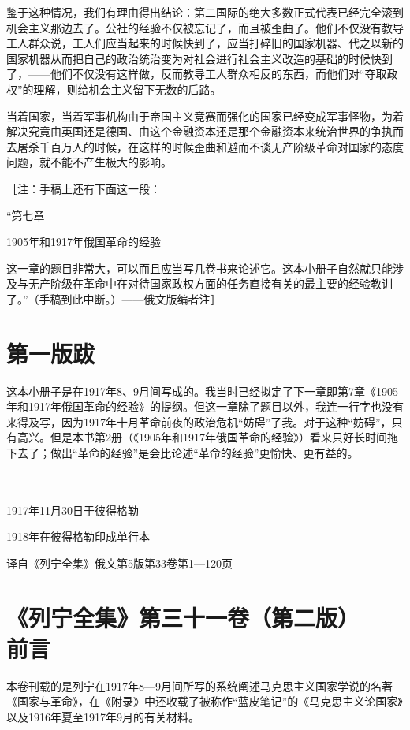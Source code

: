 \documentclass[UTF8, 12pt, a4paper]{ctexrep}
\begin{document}
鉴于这种情况，我们有理由得出结论：第二国际的绝大多数正式代表已经完全滚到机会主义那边去了。公社的经验不仅被忘记了，而且被歪曲了。他们不仅没有教导工人群众说，工人们应当起来的时候快到了，应当打碎旧的国家机器、代之以新的国家机器从而把自己的政治统治变为对社会进行社会主义改造的基础的时候快到了，——他们不仅没有这样做，反而教导工人群众相反的东西，而他们对“夺取政权”的理解，则给机会主义留下无数的后路。

当着国家，当着军事机构由于帝国主义竞赛而强化的国家已经变成军事怪物，为着解决究竟由英国还是德国、由这个金融资本还是那个金融资本来统治世界的争执而去屠杀千百万人的时候，在这样的时候歪曲和避而不谈无产阶级革命对国家的态度问题，就不能不产生极大的影响。

［注：手稿上还有下面这一段：

“第七章

1905年和1917年俄国革命的经验

这一章的题目非常大，可以而且应当写几卷书来论述它。这本小册子自然就只能涉及与无产阶级在革命中在对待国家政权方面的任务直接有关的最主要的经验教训了。”（手稿到此中断。）——俄文版编者注］

\chapter*{第一版跋}

这本小册子是在1917年8、9月间写成的。我当时已经拟定了下一章即第7章《1905年和1917年俄国革命的经验》的提纲。但这一章除了题目以外，我连一行字也没有来得及写，因为1917年十月革命前夜的政治危机“妨碍”了我。对于这种“妨碍”，只有高兴。但是本书第2册（《1905年和1917年俄国革命的经验》）看来只好长时间拖下去了；做出“革命的经验”是会比论述“革命的经验”更愉快、更有益的。

~\\

~\\

\hfill 1917年11月30日于彼得格勒

\hfill 1918年在彼得格勒印成单行本

\hfill 译自《列宁全集》俄文第5版第33卷第1—120页

\chapter*{《列宁全集》第三十一卷（第二版）\\前言}

本卷刊载的是列宁在1917年8—9月间所写的系统阐述马克思主义国家学说的名著《国家与革命》，在《附录》中还收载了被称作“蓝皮笔记”的《马克思主义论国家》以及1916年夏至1917年9月的有关材料。
\end{document}
